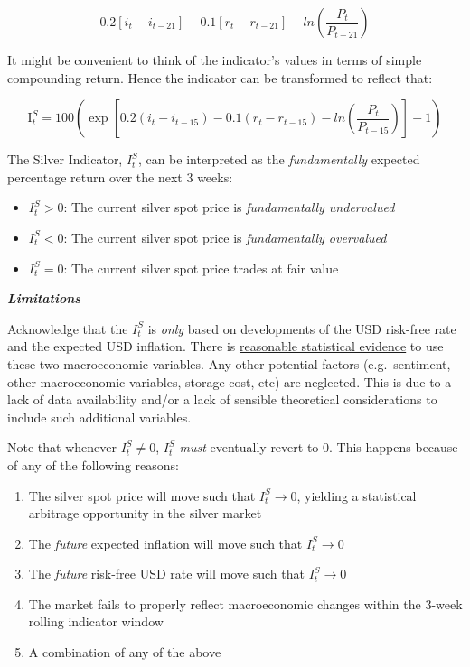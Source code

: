\documentclass[
  12pt,
]{article}
\providecommand{\tightlist}{%
  \setlength{\itemsep}{0pt}\setlength{\parskip}{0pt}}
\begin{document}
\[0.2 [i_t-i_{t-21}] - 0.1[r_t - r_{t-21}] - ln \left( \frac{P_t}{P_{t-21}} \right)\]

It might be convenient to think of the indicator's values in terms of
simple compounding return. Hence the indicator can be transformed to
reflect that:

\[\text{I}^S_t=100\left( \exp \left[ 0.2 (i_t-i_{t-15}) - 0.1(r_t - r_{t-15}) - ln \left( \frac{P_t}{P_{t-15}} \right) \right] -1 \right)\]

The Silver Indicator, \(I^S_t\), can be interpreted as the
\emph{fundamentally} expected percentage return over the next 3 weeks:

\begin{itemize}
\tightlist
\item
  \(I^S_t > 0\): The current silver spot price is \emph{fundamentally
  undervalued}
\item
  \(I^S_t < 0\): The current silver spot price is \emph{fundamentally
  overvalued}
\item
  \(I^S_t = 0\): The current silver spot price trades at fair value
\end{itemize}

\textbf{\emph{Limitations}}

Acknowledge that the \(I^S_t\) is \emph{only} based on developments of
the USD risk-free rate and the expected USD inflation. There is
\protect\hyperlink{empirical-validation}{reasonable statistical
evidence} to use these two macroeconomic variables. Any other potential
factors (e.g.~sentiment, other macroeconomic variables, storage cost,
etc) are neglected. This is due to a lack of data availability and/or a
lack of sensible theoretical considerations to include such additional
variables.

Note that whenever \(I^S_t \neq 0\), \(I^S_t\) \emph{must} eventually
revert to \(0\). This happens because of any of the following reasons:

\begin{enumerate}
\def\labelenumi{\alph{enumi}.}
\tightlist
\item
  The silver spot price will move such that \(I^S_t \to 0\), yielding a
  statistical arbitrage opportunity in the silver market
\item
  The \emph{future} expected inflation will move such that
  \(I^S_t \to 0\)
\item
  The \emph{future} risk-free USD rate will move such that
  \(I^S_t \to 0\)
\item
  The market fails to properly reflect macroeconomic changes within the
  3-week rolling indicator window
\item
  A combination of any of the above
\end{enumerate}
\end{document}
